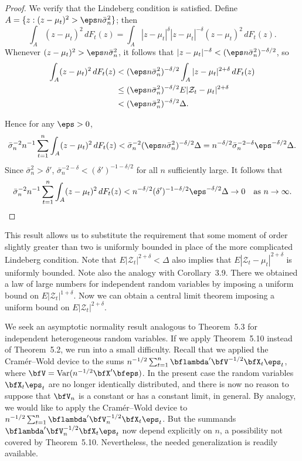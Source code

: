 
\begin{proof}
We verify that the Lindeberg condition is satisfied. Define $A = \{z : (z - \mu_t)^2 > \eps n \bar{\sigma}_n^2\}$; then
\[
\int_A (z - \mu_t)^2 \, dF_t(z) = \int_A |z - \mu_t|^{\delta} |z - \mu_t|^{-\delta} (z - \mu_t)^2 \, dF_t(z).
\]
Whenever $(z - \mu_t)^2 > \eps n \bar{\sigma}_n^2$, it follows that $|z - \mu_t|^{-\delta} < (\eps n \bar{\sigma}_n^2)^{-\delta/2}$, so
\begin{align*}
\int_A (z - \mu_t)^2 \, dF_t(z) &< (\eps n \bar{\sigma}_n^2)^{-\delta/2} \int_A |z - \mu_t|^{2+\delta} \, dF_t(z) \\
&\leq (\eps n \bar{\sigma}_n^2)^{-\delta/2} E|\mathcal{Z}_t - \mu_t|^{2+\delta} \\
&< (\eps n \bar{\sigma}_n^2)^{-\delta/2} \Delta.
\end{align*}

Hence for any $\eps > 0$,
\[
\bar{\sigma}_n^{-2} n^{-1} \sum_{t=1}^{n} \int_A (z - \mu_t)^2 \, dF_t(z) < \bar{\sigma}_n^{-2}(\eps n \bar{\sigma}_n^2)^{-\delta/2} \Delta = n^{-\delta/2} \bar{\sigma}_n^{-2-\delta} \eps^{-\delta/2} \Delta.
\]
Since $\bar{\sigma}_n^2 > \delta'$, $\bar{\sigma}_n^{-2-\delta} < (\delta')^{-1-\delta/2}$ for all $n$ sufficiently large. It follows that
\[
\bar{\sigma}_n^{-2} n^{-1} \sum_{t=1}^{n} \int_A (z - \mu_t)^2 \, dF_t(z) < n^{-\delta/2}(\delta')^{-1-\delta/2}\eps^{-\delta/2}\Delta \to 0 \quad \text{as } n \to \infty.
\]
\end{proof}

This result allows us to substitute the requirement that some moment of order slightly greater than two is uniformly bounded in place of the more complicated Lindeberg condition. Note that $E|\mathcal{Z}_t|^{2+\delta} < \Delta$ also implies that $E|\mathcal{Z}_t - \mu_t|^{2+\delta}$ is uniformly bounded. Note also the analogy with Corollary~3.9. There we obtained a law of large numbers for independent random variables by imposing a uniform bound on $E|\mathcal{Z}_t|^{1+\delta}$. Now we can obtain a central limit theorem imposing a uniform bound on $E|\mathcal{Z}_t|^{2+\delta}$.

We seek an asymptotic normality result analogous to Theorem~5.3 for independent heterogeneous random variables. If we apply Theorem~5.10 instead of Theorem~5.2, we run into a small difficulty. Recall that we applied the Cram\'{e}r--Wold device to the sums $n^{-1/2}\sum_{t=1}^{n}\bflambda'\bfV^{-1/2}\bfX_t\eps_t$, where $\bfV = \Var(n^{-1/2}\bfX'\bfeps)$. In the present case the random variables $\bfX_t\eps_t$ are no longer identically distributed, and there is now no reason to suppose that $\bfV_n$ is a constant or has a constant limit, in general. By analogy, we would like to apply the Cram\'{e}r--Wold device to $n^{-1/2}\sum_{t=1}^{n}\bflambda'\bfV_n^{-1/2}\bfX_t\eps_t$. But the summands $\bflambda'\bfV_n^{-1/2}\bfX_t\eps_t$ now depend explicitly on $n$, a possibility not covered by Theorem~5.10. Nevertheless, the needed generalization is readily available.

